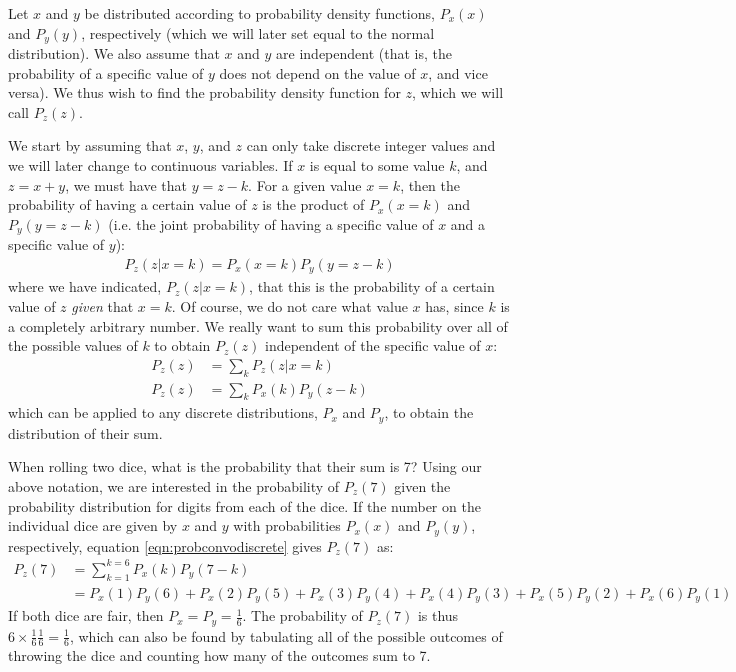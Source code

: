 Let $x$ and $y$ be distributed according to probability density functions, $P_x(x)$ and $P_y(y)$, respectively (which we will later set equal to the normal distribution). We also assume that $x$ and $y$ are independent (that is, the probability of a specific value of $y$ does not depend on the value of $x$, and vice versa). We thus wish to find the probability density function for $z$, which we will call $P_z(z)$.

We start by assuming that $x$, $y$, and $z$ can only take discrete integer values and we will later change to continuous variables. If $x$ is equal to some value $k$, and $z=x+y$, we must have that $y=z-k$. For a given value $x=k$, then the probability of having a certain value of $z$ is the product of $P_x(x=k)$ and $P_y(y=z-k)$ (i.e. the joint probability of having a specific value of $x$ and a specific value of $y$):
\begin{align*}
P_z(z|x=k)=P_x(x=k)P_y(y=z-k)
\end{align*} 
where we have indicated, $P_z(z|x=k)$, that this is the probability of a certain value of $z$ \textit{given} that $x=k$. Of course, we do not care what value $x$ has, since $k$ is a completely arbitrary number. We really want to sum this probability over all of the possible values of $k$ to obtain $P_z(z)$ independent of the specific value of $x$:
\begin{align}
\label{eqn:probconvodiscrete}
P_z(z)&=\sum_kP_z(z|x=k)\nonumber\\
P_z(z)&=\sum_kP_x(k)P_y(z-k)
\end{align}
which can be applied to any discrete distributions, $P_x$ and $P_y$, to obtain the distribution of their sum. 
\begin{example}{}{When rolling two dice, what is the probability that their sum is 7?}{}
Using our above notation, we are interested in the probability of $P_z(7)$ given the probability distribution for digits from each of the dice. If the number on the individual dice are given by $x$ and $y$ with probabilities $P_x(x)$ and $P_y(y)$, respectively, equation \ref{eqn:probconvodiscrete} gives $P_z(7)$ as:
\begin{align*}
P_z(7)&=\sum_{k=1}^{k=6} P_x(k)P_y(7-k)\\
 &=P_x(1)P_y(6)+P_x(2)P_y(5)+P_x(3)P_y(4)+P_x(4)P_y(3)+P_x(5)P_y(2)+P_x(6)P_y(1)
\end{align*} 
If both dice are fair, then $P_x=P_y=\frac{1}{6}$. The probability of $P_z(7)$ is thus $6\times\frac{1}{6}\frac{1}{6}=\frac{1}{6}$, which can also be found by tabulating all of the possible outcomes of throwing the dice and counting how many of the outcomes sum to 7. 
\end{example}


